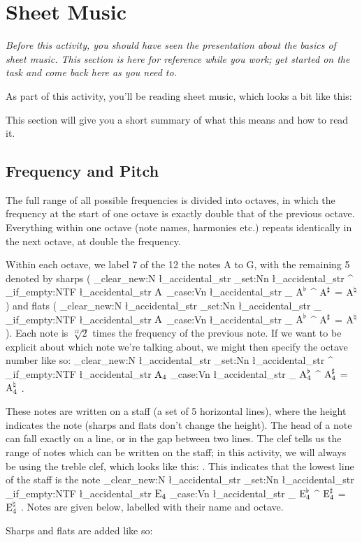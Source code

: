 \documentclass{article}
\newcommand{\notename}[3][]{
    \str_clear_new:N \l_accidental_str%
    \str_set:Nn \l_accidental_str {#1}%
    \str_if_empty:NTF \l_accidental_str {
        \ensuremath{\text{#2}\sb{#3}}%
    }{
        \str_case:Vn \l_accidental_str {%
            {_} {\ensuremath{\text{#2}^{\flat}\sb{#3}}}%
            {^} {\ensuremath{\text{#2}^{\sharp}\sb{#3}}}%
            {=} {\ensuremath{\text{#2}^{\natural}\sb{#3}}}%
        }
    }
}
\newcommand{\important}[1]{{\color{Accent1}#1}}
\begin{document}
\clearpage

\section{Sheet Music}

\textit{Before this activity, you should have seen the presentation about the basics of sheet music. This section is here for reference while you work; get started on the task and come back here as you need to.}

As part of this activity, you'll be reading sheet music, which looks a bit like this:



This section will give you a short summary of what this means and how to read it. 

\subsection{Frequency and Pitch}

The full range of all possible frequencies is divided into \important{octaves}, in which the frequency at the start of one octave is exactly double that of the previous octave. Everything within one octave (note names, harmonies etc.) repeats identically in the next octave, at double the frequency.

Within each octave, we label 7 of the 12 the notes A to G, with the remaining 5 denoted by \important{sharps} (\notename[^]{A}{}) and \important{flats} (\notename[_]{A}{}). Each note is $\sqrt[12]{2}$ times the frequency of the previous note. If we want to be explicit about which note we're talking about, we might then specify the octave number like so: \notename[^]{A}{4}. 

These notes are written on a \important{staff} (a set of 5 horizontal lines), where the height indicates the note (sharps and flats don't change the height). The head of a note can fall exactly on a line, or in the gap between two lines. The \important{clef} tells us the range of notes which can be written on the staff; in this activity, we will always be using the treble clef, which looks like this: \resizebox{0.65\baselineskip}{!}{}. This indicates that the lowest line of the staff is the note \notename{E}{4}. Notes are given below, labelled with their name and octave.



Sharps and flats are added like so: \raisebox{-0.35\height}{}
\end{document}
